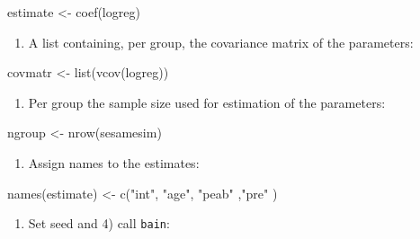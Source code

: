 \documentclass[
]{book}
\newenvironment{Shaded}{\begin{snugshade}}{\end{snugshade}}
\newcommand{\FunctionTok}[1]{\textcolor[rgb]{0.00,0.00,0.00}{#1}}
\newcommand{\NormalTok}[1]{#1}
\newcommand{\OtherTok}[1]{\textcolor[rgb]{0.56,0.35,0.01}{#1}}
\newcommand{\StringTok}[1]{\textcolor[rgb]{0.31,0.60,0.02}{#1}}
\providecommand{\tightlist}{%
  \setlength{\itemsep}{0pt}\setlength{\parskip}{0pt}}
\begin{document}
\begin{Shaded}
\begin{Highlighting}[]
\NormalTok{estimate }\OtherTok{\textless{}{-}} \FunctionTok{coef}\NormalTok{(logreg)}
\end{Highlighting}
\end{Shaded}

\begin{enumerate}
\def\labelenumi{\alph{enumi})}
\setcounter{enumi}{1}
\tightlist
\item
  A list containing, per group, the covariance
  matrix of the parameters:
\end{enumerate}

\begin{Shaded}
\begin{Highlighting}[]
\NormalTok{covmatr }\OtherTok{\textless{}{-}} \FunctionTok{list}\NormalTok{(}\FunctionTok{vcov}\NormalTok{(logreg))}
\end{Highlighting}
\end{Shaded}

\begin{enumerate}
\def\labelenumi{\alph{enumi})}
\setcounter{enumi}{2}
\tightlist
\item
  Per group the sample size used for estimation of the parameters:
\end{enumerate}

\begin{Shaded}
\begin{Highlighting}[]
\NormalTok{ngroup }\OtherTok{\textless{}{-}} \FunctionTok{nrow}\NormalTok{(sesamesim)}
\end{Highlighting}
\end{Shaded}

\begin{enumerate}
\def\labelenumi{\arabic{enumi})}
\setcounter{enumi}{1}
\tightlist
\item
  Assign names to the estimates:
\end{enumerate}

\begin{Shaded}
\begin{Highlighting}[]
\FunctionTok{names}\NormalTok{(estimate) }\OtherTok{\textless{}{-}} \FunctionTok{c}\NormalTok{(}\StringTok{"int"}\NormalTok{, }\StringTok{"age"}\NormalTok{, }\StringTok{"peab"}\NormalTok{ ,}\StringTok{"pre"}\NormalTok{ )}
\end{Highlighting}
\end{Shaded}

\begin{enumerate}
\def\labelenumi{\arabic{enumi})}
\setcounter{enumi}{2}
\tightlist
\item
  Set seed and 4) call \texttt{bain}:
\end{enumerate}
\end{document}
